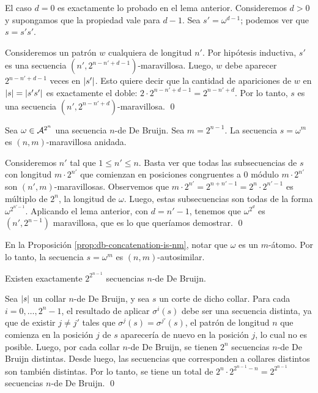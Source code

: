 \begin{demo}
  El caso $d = 0$ es exactamente lo probado en el lema anterior.
  Consideremos $d > 0$ y supongamos que la propiedad vale para $d - 1$.
  Sea $s' = \omega^{d-1}$; podemos ver que $s = s's'$.

  Consideremos un patrón $w$ cualquiera de longitud $n'$. Por hipótesis
  inductiva, $s'$ es una secuencia $(n',2^{n-n'+d-1})$-maravillosa. Luego, $w$
  debe aparecer $2^{n-n'+d-1}$ veces en $\left\vert s'\right\vert$.
  Esto quiere decir que la cantidad de apariciones de $w$ en $\left\vert s\right\vert =
    \left\vert s's'\right\vert$ es exactamente el doble: $2 \cdot 2^{n-n'+d-1} = 2^{n-n'+d}$.
  Por lo tanto, $s$ es una secuencia $(n',2^{n-n'+d})$-maravillosa. \qed
\end{demo}

\begin{prop}
  \label{prop:db-concatenation-is-nm}
  Sea $\omega \in \mathcal{A}^{2^n}$ una secuencia $n$-de De Bruijn.
  Sea $m = 2^{n-1}$. La secuencia $s = \omega^{m}$ es $(n,m)$-maravillosa
  anidada.
\end{prop}

\begin{demo}
  Consideremos $n'$ tal que $1 \leq n' \leq n$. Basta ver que todas las
  subsecuencias de $s$ con longitud $m \cdot 2^{n'}$ que comienzan en
  posiciones congruentes a $0$ módulo $m \cdot 2^{n'}$ son
  $(n',m)$-maravillosas. Observemos que $m \cdot 2^{n'} = 2^{n+n'-1} = 2^n
    \cdot 2^{n'-1}$ es múltiplo de $2^n$, la longitud de $\omega$.
  Luego, estas subsecuencias son todas de la forma $\omega^{2^{n'-1}}$.
  Aplicando el lema anterior, con $d = n'-1$, tenemos que $\omega^{2^d}$
  es $(n',2^{n-1})$ maravillosa, que es lo que queríamos demostrar. \qed
\end{demo}

\begin{obs}
  En la Proposición \ref{prop:db-concatenation-is-nm}, notar que $\omega$ es un
  $m$-átomo. Por lo tanto, la secuencia $s = \omega^m$ es $(n,m)$-autosimilar.
\end{obs}

\begin{lema}
  \label{lema:db-sequence-count}
  Existen exactamente $2^{2^{n-1}}$ secuencias $n$-de De Bruijn.
\end{lema}

\begin{demo}
  Sea $\left\vert s\right\vert$ un collar $n$-de De Bruijn, y sea $s$ un corte de dicho
  collar. Para cada $i = 0,\dots,2^n-1$, el resultado de aplicar $\sigma^i(s)$
  debe ser una secuencia distinta, ya que de existir $j \neq j'$ tales que
  $\sigma^j(s) = \sigma^{j'}(s)$, el patrón de longitud $n$ que comienza en la
  posición $j$ de $s$ aparecería de nuevo en la posición $j$, lo cual no es
  posible. Luego, por cada collar $n$-de De Bruijn, se tienen $2^n$ secuencias
  $n$-de De Bruijn distintas. Desde luego, las secuencias que corresponden a
  collares distintos son también distintas. Por lo tanto, se tiene un total de
  $2^n \cdot 2^{2^{n-1}-n} = 2^{2^{n-1}}$ secuencias $n$-de De Bruijn. \qed
\end{demo}


